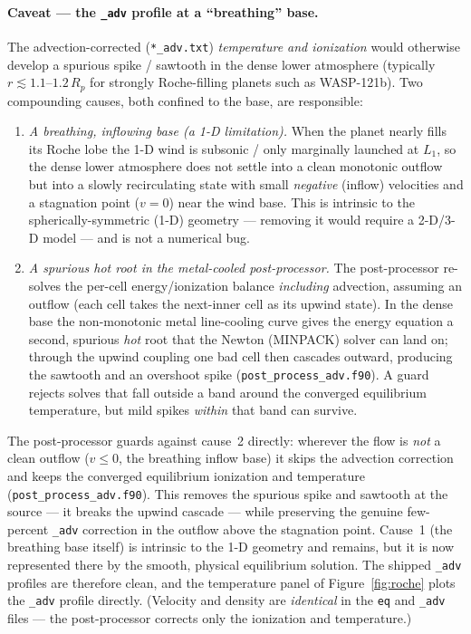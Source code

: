 \documentclass[english,a4paper]{kiseon_memo}
\begin{document}
\paragraph{Caveat --- the \texttt{\_adv} profile at a ``breathing'' base.}
The advection-corrected (\texttt{*\_adv.txt}) \emph{temperature and ionization}
would otherwise develop a spurious spike / sawtooth in the dense lower atmosphere
(typically $r\lesssim1.1$--$1.2\,R_p$ for strongly Roche-filling planets such as
WASP-121b). Two compounding causes, both confined to the base, are responsible:
\begin{enumerate}\itemsep2pt
\item \emph{A breathing, inflowing base (a 1-D limitation).} When the planet
  nearly fills its Roche lobe the 1-D wind is subsonic / only marginally launched
  at $L_1$, so the dense lower atmosphere does not settle into a clean monotonic
  outflow but into a slowly recirculating state with small \emph{negative}
  (inflow) velocities and a stagnation point ($v=0$) near the wind base. This is
  intrinsic to the spherically-symmetric (1-D) geometry --- removing it would
  require a 2-D/3-D model --- and is not a numerical bug.
\item \emph{A spurious hot root in the metal-cooled post-processor.} The
  post-processor re-solves the per-cell energy/ionization balance \emph{including}
  advection, assuming an outflow (each cell takes the next-inner cell as its
  upwind state). In the dense base the non-monotonic metal line-cooling curve
  gives the energy equation a second, spurious \emph{hot} root that the Newton
  (MINPACK) solver can land on; through the upwind coupling one bad cell then
  cascades outward, producing the sawtooth and an overshoot spike
  (\texttt{post\_process\_adv.f90}). A guard rejects solves that fall outside a
  band around the converged equilibrium temperature, but mild spikes \emph{within}
  that band can survive.
\end{enumerate}
The post-processor guards against cause~2 directly: wherever the flow is
\emph{not} a clean outflow ($v\le0$, the breathing inflow base) it skips the
advection correction and keeps the converged equilibrium ionization and
temperature (\texttt{post\_process\_adv.f90}). This removes the spurious spike and
sawtooth at the source --- it breaks the upwind cascade --- while preserving the
genuine few-percent \texttt{\_adv} correction in the outflow above the stagnation
point. Cause~1 (the breathing base itself) is intrinsic to the 1-D geometry and
remains, but it is now represented there by the smooth, physical equilibrium
solution. The shipped \texttt{\_adv} profiles are therefore clean, and the
temperature panel of Figure~\ref{fig:roche} plots the \texttt{\_adv} profile
directly. (Velocity and density are \emph{identical} in the \texttt{eq} and
\texttt{\_adv} files --- the post-processor corrects only the ionization and
temperature.)
\end{document}
